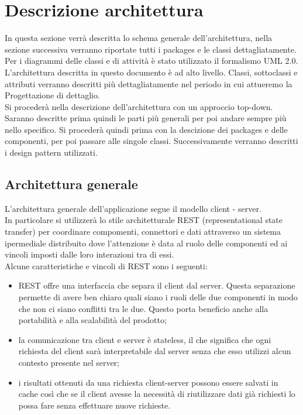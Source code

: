 \section{Descrizione architettura} 
\label{architettura}
	In questa sezione verrà descritta lo schema generale dell'architettura, nella sezione successiva %
	verranno riportate tutti i packages e le classi dettagliatamente.
	 Per i diagrammi delle classi e di attività è stato utilizzato il formalismo UML 2.0. \\
	 L'architettura descritta in questo documento è ad alto livello. Classi, sottoclassi e attributi verranno descritti più dettagliatamente nel periodo in cui attueremo la Progettazione di dettaglio. \\
	 Si procederà nella descrizione dell'architettura con un approccio top-down. Saranno descritte prima quindi le parti più generali per poi andare sempre più nello specifico. Si procederà quindi prima con la descizione dei packages e delle componenti, per poi passare alle singole classi. Successivamente verranno descritti i design pattern utilizzati.
	
	\subsection{Architettura generale}
	L'architettura generale dell'applicazione segue il modello client - server. \\
	In particolare si utilizzerà lo stile architetturale REST (representational state transfer) per coordinare compomenti, connettori e dati attraverso un sistema ipermediale distribuito dove l'attenzione è data al ruolo delle componenti ed ai vincoli imposti dalle loro interazioni tra di essi. \\
	Alcune caratteristiche e vincoli di REST sono i seguenti:	
	\begin{itemize}
		\item REST offre una interfaccia che separa il client dal server. Questa separazione permette di avere ben chiaro quali siano i ruoli delle due componenti in modo che non ci siano conflitti tra le due. Questo porta beneficio anche alla portabilità e alla scalabilità del prodotto;
		\item la comunicazione tra client e server è stateless, il che significa che ogni richiesta del client sarà interpretabile dal server senza che esso utilizzi alcun contesto presente nel server;
		\item i risultati ottenuti da una richiesta client-server possono essere salvati in cache così che se il client avesse la necessità di riutilizzare dati già richiesti lo possa fare senza effettuare nuove richieste.
		
	\end{itemize}
		
		